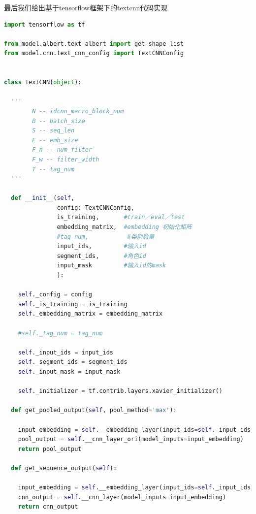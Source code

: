 \documentclass[twoside,a4paper,12pt]{book}%
\begin{document}
最后我们给出基于tensorflow框架下的textcnn代码实现 
\begin{lstlisting}[language={python}]
import tensorflow as tf

from model.albert.text_albert import get_shape_list
from model.cnn.text_cnn_config import TextCNNConfig


class TextCNN(object):

  '''
        N -- idcnn_macro_block_num
		B -- batch_size
		S -- seq_len
		E -- emb_size
		F_n -- num_filter
		F_w -- filter_width
		T -- tag_num
  '''

  def __init__(self,
               config: TextCNNConfig,
               is_training,       #train／eval／test
               embedding_matrix,  #embedding 初始化矩阵
               #tag_num,           #类别数量
               input_ids,         #输入id
               segment_ids,       #角色id
               input_mask         #输入id的mask
               ):

    self._config = config
    self._is_training = is_training
    self._embedding_matrix = embedding_matrix

    #self._tag_num = tag_num

    self._input_ids = input_ids
    self._segment_ids = segment_ids
    self._input_mask = input_mask

    self._initializer = tf.contrib.layers.xavier_initializer()

  def get_pooled_output(self, pool_method='max'):

    input_embedding = self.__embedding_layer(input_ids=self._input_ids, segment_ids=self._segment_ids)
    pool_output = self.__cnn_layer_ori(model_inputs=input_embedding)
    return pool_output

  def get_sequence_output(self):

    input_embedding = self.__embedding_layer(input_ids=self._input_ids, segment_ids=self._segment_ids)
    cnn_output = self.__cnn_layer(model_inputs=input_embedding)
    return cnn_output


\end{lstlisting}
\end{document}
